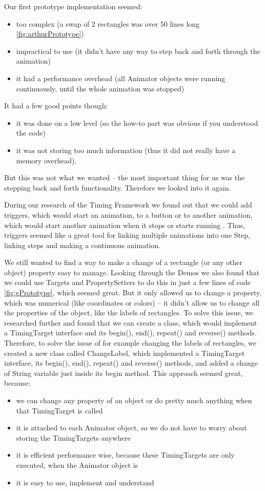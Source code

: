 \documentclass{l3proj}
\begin{document}
Our first prototype implementation seemed: 
\begin{itemize}
	\item too complex (a swap of 2 rectangles was over 50 lines long \ref{fig:arthurPrototype})
	\item impractical to use (it didn’t have any way to step back and forth through the animation) 
	\item it had a performance overhead (all Animator objects were running continuously, until the whole animation was stopped)
\end{itemize}
It had a few good points though: 
\begin{itemize}
	\item it was done on a low level (so the how-to part was obvious if you understood the code) 
	\item it was not storing too much information (thus it did not really have a memory overhead). 
\end{itemize}
But this was not what we wanted – the most important thing for us was the stepping back and forth functionality.  Therefore we looked into it again.

During our research of the Timing Framework we found out that we could add triggers, which would start an animation, to a button or to another animation, which would start another animation when it stops or starts running \cite{website:TimingFrameworkDemo}. Thus, triggers seemed like a great tool for linking multiple animations into one Step, linking steps and making a continuous animation.



We still wanted to find a way to make a change of a rectangle (or any other object) property easy to manage. Looking through the Demos we also found that we could use Targets and PropertySetters to do this in just a few lines of code \ref{fig:gPrototype}, which seemed great. But it only allowed us to change a property, which was numerical (like coordinates or colors) – it didn’t allow us to change all the properties of the object, like the labels of rectangles. To solve this issue, we researched further and found that we can create a class, which would implement a TimingTarget interface and its begin(), end(), repeat() and reverse() methods. Therefore, to solve the issue of for example changing the labels of rectangles, we created a new class called ChangeLabel, which implemented a TimingTarget interface, its begin(), end(), repeat() and reverse() methods, and added a change of String variable just inside its begin method. This approach seemed great, because:
\begin{itemize}
	\item we can change any property of an object or do pretty much anything when that TimingTarget is called
	\item it is attached to each Animator object, so we do not have to worry about storing the TimingTargets anywhere
	\item it is efficient performance wise, because these TimingTargets are only executed, when the Animator object is
	\item it is easy to use, implement and understand
\end{itemize}
\end{document}

